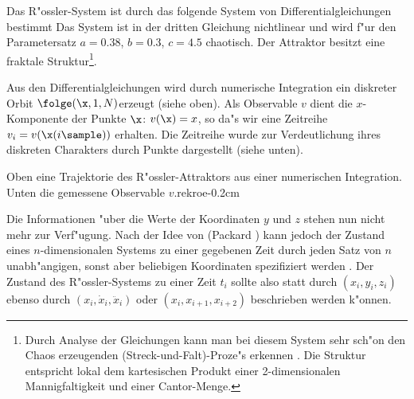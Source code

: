 Das R"ossler-System \cite{Roessler76} ist durch das folgende System von
Differentialgleichungen bestimmt
Das System ist in der dritten Gleichung nichtlinear und wird f"ur den Parametersatz
$a=0.38$, $b=0.3$, $c=4.5$ chaotisch. Der Attraktor besitzt eine fraktale
Struktur\footnote{Durch Analyse der Gleichungen kann man bei diesem System sehr sch"on den Chaos
  erzeugenden \metapher(Streck-und-Falt)-Proze"s erkennen \cite{Peitgen92}.  Die Struktur
  entspricht lokal dem kartesischen Produkt einer 2-dimensionalen Mannigfaltigkeit und einer
  Cantor-Menge.}.

Aus den Differentialgleichungen wird durch numerische Integration ein diskreter
Orbit $\folge(\x,1,N)$\footnotemark erzeugt (siehe  oben).  Als Observable $v$ dient die $x$-Komponente der
Punkte $\x$: $v(\x)=x$, so da"s wir eine Zeitreihe $v_i = v(\x(i\sample))$ erhalten. 
Die Zeitreihe wurde zur Verdeutlichung ihres diskreten Charakters durch Punkte
dargestellt (siehe  unten).  


{Oben eine Trajektorie des R"ossler-Attraktors aus einer numerischen
Integration. Unten die gemessene Observable $v$.}{rekroe}{-0.2cm}

Die Informationen "uber die Werte der Koordinaten $y$ und $z$ stehen nun nicht mehr zur
Verf"u\-gung. Nach der Idee von \autor(Packard \etal) kann jedoch der Zustand eines
$n$-dimensio\-na\-len Systems zu einer gegebenen Zeit durch jeden Satz von $n$
unabh"angigen, sonst aber beliebigen Koordinaten spezifiziert werden \cite{Packard80}.
Der Zustand des R"ossler-Systems zu einer Zeit $t_i$ sollte also statt durch
$(x_i,y_i,z_i)$ ebenso durch $(x_i,\dot x_i,\ddot x_i)$ oder $(x_i,x_{i+1},x_{i+2})$
beschrieben werden k"onnen.

